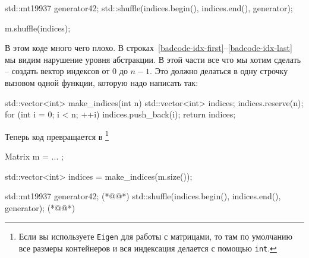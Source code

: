 \begin{enumerate}
\begin{cppcode}
std::mt19937 generator{42};
std::shuffle(indices.begin(), indices.end(), generator);

m.shuffle(indices);
\end{cppcode}
В этом коде много чего плохо.
В строках~\ref{badcode-idx-first}--\ref{badcode-idx-last} мы видим нарушение уровня абстракции.
В этой части все что мы хотим сделать -- создать вектор индексов от $0$ до $n-1$.
Это должно делаться в одну строчку вызовом одной функции, которую надо написать так:
\begin{cppcode}
std::vector<int> make_indices(int n) {
  std::vector<int> indices;
  indices.reserve(n);
  for (int i = 0; i < n; ++i)
    indices.push_back(i);
  return indices;
}
\end{cppcode}
Теперь код превращается в%
\footnote{Если вы используете \texttt{Eigen} для работы с матрицами, то там по умолчанию все размеры контейнеров и вся индексация делается с помощью \verb"int".}
\begin{cppcode}
Matrix m = ... ;

std::vector<int> indices  = make_indices(m.size());

std::mt19937 generator{42}; (*@@*)
std::shuffle(indices.begin(), indices.end(), generator); (*@@*)


\end{cppcode}
\end{enumerate}
